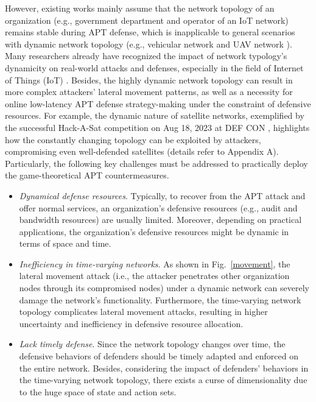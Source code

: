 \documentclass[lettersize,journal]{IEEEtran}
\begin{document}
However, existing works mainly assume that the network topology of an organization (e.g., government department and operator of an IoT network) remains stable during APT defense, which is inapplicable to general scenarios with dynamic network topology (e.g., vehicular network \cite{wang2022task,wang2021blockchain} and UAV network \cite{wang2023seal,wang2023secure}). Many researchers already have recognized the impact of network typology's dynamicity on real-world attacks and defenses, especially in the field of Internet of Things (IoT) \cite{xiao2018security,nguyen2021deep,wang2020bc}. Besides, the highly dynamic network topology can result in more complex attackers' lateral movement patterns, as well as a necessity for online low-latency APT defense strategy-making under the constraint of defensive resources. For example, the dynamic nature of satellite networks, exemplified by the successful Hack-A-Sat competition \cite{Hack-A-Sat} on Aug 18, 2023 at DEF CON \cite{DEFCON}, highlights how the constantly changing topology can be exploited by attackers, compromising even well-defended satellites (details refer to Appendix A). Particularly, the following key challenges must be addressed to practically deploy the game-theoretical APT countermeasures.

\par


\begin{itemize}
      \item \textit{Dynamical defense resources}. 
      Typically, to recover from the APT attack and offer normal services, an organization's defensive resources (e.g., audit and bandwidth resources) are usually limited. Moreover, depending on practical applications, the organization's defensive resources might be dynamic in terms of space and time. 
      
      \item \textit{Inefficiency in time-varying networks}. As shown in Fig.~\ref{movement}, the lateral movement attack (i.e., the attacker penetrates other organization nodes through its compromised nodes) under a dynamic network can severely damage the network's functionality. Furthermore, the time-varying network topology complicates lateral movement attacks, resulting in higher uncertainty and inefficiency in defensive resource allocation. 
      
      \item \textit{Lack timely defense}. Since the network topology changes over time, the defensive behaviors of defenders should be timely adapted and enforced on the entire network. Besides, considering the impact of defenders' behaviors in the time-varying network topology, there exists a curse of dimensionality due to the huge space of state and action sets.   
    
  \end{itemize}
 
\end{document}
